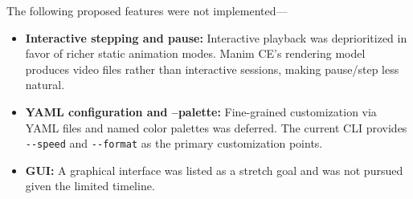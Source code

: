 The following proposed features were not implemented---

\begin{itemize}
    \item \textbf{Interactive stepping and pause:} Interactive playback was deprioritized in favor of richer static animation modes. Manim CE's rendering model produces video files rather than interactive sessions, making pause/step less natural.

    \item \textbf{YAML configuration and --palette:} Fine-grained customization via YAML files and named color palettes was deferred. The current CLI provides \texttt{-{}-speed} and \texttt{-{}-format} as the primary customization points.

    \item \textbf{GUI:} A graphical interface was listed as a stretch goal and was not pursued given the limited timeline.
\end{itemize}
